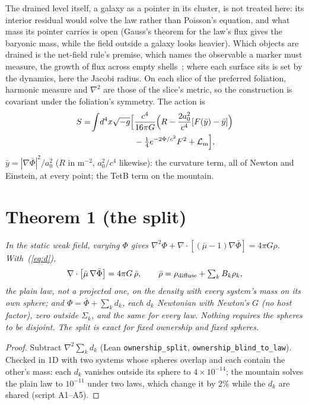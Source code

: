 \documentclass[twocolumn]{iopjournal}
\begin{document}
The drained level itself, a galaxy as a pointer in its cluster, is
not treated here: its interior residual would solve the law rather
than Poisson's equation, and what mass its pointer carries is open
(Gauss's theorem for the law's flux gives the baryonic mass, while
the field outside a galaxy looks heavier). Which objects are drained
is the net-field rule's premise,
which names the observable a marker must measure, the growth of flux
across empty shells~\cite{NelsonNFR}; where each surface sits is set by
the dynamics, here the Jacobi radius. On each slice
of the preferred foliation, harmonic measure and $\nabla^2$ are those
of the slice's metric, so the construction is covariant under the
foliation's symmetry. The action is
\begin{equation}
\begin{aligned}
S = \!\int\! d^4x\sqrt{-g}\Big[&\frac{c^4}{16\pi G}\Big(R - \frac{2a_0^2}{c^4}[F(\bar y) - \bar y]\Big)\\
&- \tfrac14e^{-2\Phi/c^2}F^2 + \mathcal L_{\rm m}\Big],
\end{aligned}
\label{eq:S}
\end{equation}
$\bar y = |\nabla\bar\Phi|^2/a_0^2$ ($R$ in m$^{-2}$, $a_0^2/c^4$
likewise): the curvature term, all of Newton and Einstein, at every
point; the TetB term on the mountain.


\section*{Theorem 1 (the split)}

\emph{In the static weak field, varying $\Phi$ gives
$\nabla^2\Phi + \nabla\cdot[(\bar\mu - 1)\nabla\bar\Phi] = 4\pi G\rho$.
With~(\ref{eq:d}),
\begin{equation}
\nabla\cdot\big[\bar\mu\,\nabla\bar\Phi\big] = 4\pi G\,\bar\rho,\qquad
\bar\rho = \rho_{\rm diffuse} + \textstyle\sum_k B_k\rho_k,
\label{eq:mountain}
\end{equation}
the plain law, not a projected one, on the density with every
system's mass on its own sphere; and $\Phi = \bar\Phi + \sum_k d_k$,
each $d_k$ Newtonian with Newton's $G$ (no host factor), zero outside
$\Sigma_k$, and the same for every law. Nothing requires the spheres to
be disjoint. The split is exact for fixed ownership and fixed spheres.}

\begin{proof}
Subtract $\nabla^2\sum_kd_k$ (Lean \texttt{ownership\_split},
\texttt{ownership\_blind\_to\_law}). Checked in 1D with two systems
whose spheres overlap and each contain the other's mass: each $d_k$
vanishes outside its sphere to $4\times10^{-14}$; the mountain solves
the plain law to $10^{-11}$ under two laws, which change it by 2\%
while the $d_k$ are shared (script A1--A5).
\end{proof}
\end{document}
